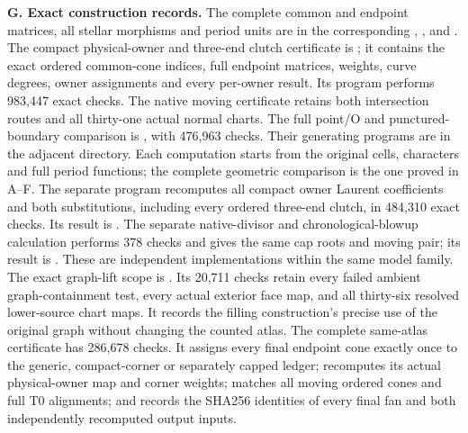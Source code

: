 \medskip\noindent\textbf{G. Exact construction records.}
The complete common and endpoint matrices, all stellar morphisms and
period units are in the corresponding
,
,
 and
.
The compact physical-owner and three-end clutch certificate is
; it
contains the exact ordered common-cone indices, full endpoint matrices,
weights, curve degrees, owner assignments and every per-owner result.
Its program performs 983,447 exact checks.  The native moving certificate
 retains both
intersection routes and all thirty-one actual normal charts.  The full
point/O and punctured-boundary comparison is
,
with 476,963 checks.  Their generating programs are in the adjacent
 directory.  Each computation starts from the original cells,
characters and full period functions; the complete geometric comparison
is the one proved in A--F.
The separate program
 recomputes all compact
owner Laurent coefficients and both substitutions, including every
ordered three-end clutch, in 484,310 exact checks.  Its result is
.
The separate native-divisor and chronological-blowup calculation
 performs 378 checks and
gives the same cap roots and moving pair; its result is
.
These are independent implementations within the same model family.
The exact graph-lift scope is
.
Its 20,711 checks retain every failed ambient graph-containment test,
every actual exterior face map, and all thirty-six resolved lower-source
chart maps.  It records the filling construction's precise use of the
original graph without changing the counted atlas.
The complete same-atlas certificate
 has
286,678 checks.  It assigns every final endpoint cone exactly once to
the generic, compact-corner or separately capped ledger; recomputes
its actual physical-owner map and corner weights; matches all moving
ordered cones and full T0 alignments; and records the SHA256 identities
of every final fan and both independently recomputed output inputs.
